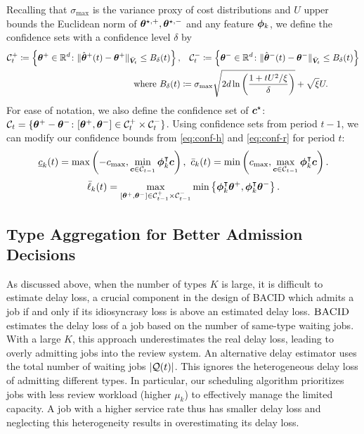 Recalling that $\sigma_{\max}$ is the variance proxy of cost distributions and  $U$ upper bounds the Euclidean norm of $\boldsymbol{\theta}^{\star,+},\boldsymbol{\theta}^{\star,-}$ and any feature $\boldsymbol{\phi}_k$, we define the confidence sets with a confidence level $\delta$ by 
\begin{equation}\label{eq:contextual-def-conf}
\begin{aligned}
\mathcal{C}^+_t \coloneqq \left\{\boldsymbol{\theta}^{+} \in \mathbb{R}^{d} \colon \|\hat{\boldsymbol{\theta}}^{+}(t) - \boldsymbol{\theta}^{+}\|_{\bar{\boldsymbol{V}}_t} \leq B_{\delta}(t)\right\}, &\quad \mathcal{C}^-_t \coloneqq \left\{\boldsymbol{\theta}^{-}\in \mathbb{R}^{d} \colon \|\hat{\boldsymbol{\theta}}^{-}(t) - \boldsymbol{\theta}^{-}\|_{\bar{\boldsymbol{V}}_t} \leq B_{\delta}(t)\right\} \\ 
\text{where }
B_{\delta}(t) &\coloneqq \sigma_{\max}\sqrt{2d\ln\left(\frac{1+tU^2/\xi}{\delta}\right)} + \sqrt{\xi}U.
\end{aligned}
\end{equation}
For ease of notation, we also define 
the confidence set of $\boldsymbol{c}^{\star}$: $\mathcal{C}_t = \{\boldsymbol{\theta}^{+} - \boldsymbol{\theta}^{-} \colon [\boldsymbol{\theta}^{+},\boldsymbol{\theta}^{-}] \in \mathcal{C}_t^+ \times \mathcal{C}_t^-\}$. Using confidence sets from period $t-1$, we can modify our confidence bounds from \eqref{eq:conf-h} and \eqref{eq:conf-r} for period $t$: 
\begin{equation}\label{eq:conf-h-feature}
\underline{c}_k(t) = \max\left(-c_{\max},\min_{\boldsymbol{c} \in \mathcal{C}_{t-1}} \boldsymbol{\phi}_k^{\intercal}\boldsymbol{c}\right),~\bar{c}_k(t) = \min\left(c_{\max},\max_{\boldsymbol{c} \in \mathcal{C}_{t-1}}\boldsymbol{\phi}_k^{\intercal}\boldsymbol{c}\right).
\end{equation}
\begin{equation}\label{eq:conf-r-feature}
\bar{\ell}_k(t) = \max_{[\boldsymbol{\theta}^{+},\boldsymbol{\theta}^{-}] \in \mathcal{C}^+_{t-1} \times \mathcal{C}^-_{t-1}} \min\left\{\boldsymbol{\phi}_k^{\intercal}\boldsymbol{\theta}^{+}, \boldsymbol{\phi}_k^{\intercal}\boldsymbol{\theta}^{-}\right\}.
\end{equation}

\subsection{Type Aggregation for Better Admission Decisions}\label{sec:aggregate}
As discussed above, when the number of types $K$ is large, it is difficult to estimate delay loss, a crucial component in the design of \textsc{BACID} which admits a job if and only if its idiosyncrasy loss is above an estimated delay loss. $\textsc{BACID}$ estimates the delay loss of a job based on the number of same-type waiting jobs. With a large $K$, this approach underestimates the real delay loss, leading to overly admitting jobs into the review system. An alternative delay estimator uses the total number of waiting jobs $|\mathcal{Q}(t)|$. This ignores the heterogeneous delay loss of admitting different types. In particular, our scheduling algorithm prioritizes jobs with less review workload (higher $\mu_k$) to effectively manage the limited capacity. A job with a higher service rate thus has smaller delay loss and neglecting this heterogeneity results in overestimating its delay loss.

